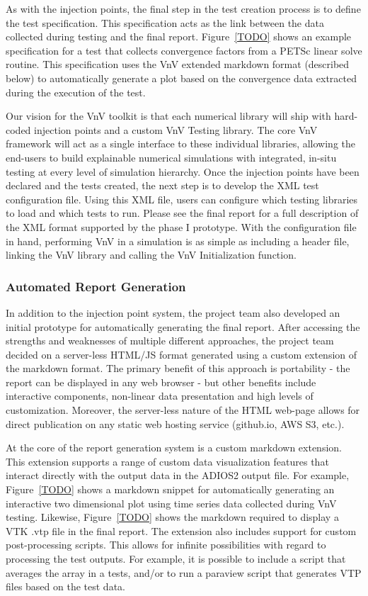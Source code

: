 As with the injection points, the final step in the test creation process is to define the test specification. This specification acts as the link between the data collected during testing and the final report. Figure~\ref{TODO} shows an example specification 
for a test that collects convergence factors from a PETSc linear solve routine. This specification uses the VnV extended markdown format (described below) to automatically generate a plot based on the convergence data extracted during the execution of the test.

Our vision for the VnV toolkit is that each numerical library will ship with hard-coded injection points and a custom VnV Testing library. The core VnV framework will act as a single interface to these individual libraries, allowing the end-users to build explainable numerical simulations with integrated, in-situ testing at every level of simulation hierarchy. Once the injection points have been declared and the tests created, the next step is to develop the XML test configuration file. Using this XML file, users can configure which testing libraries to load and which tests to run. Please see the final report for a full description of the XML format supported by the phase I prototype. With the configuration file in hand, performing VnV in a simulation is as simple as including a header file, linking the VnV library and calling the VnV Initialization function. 

\subsubsection{Automated Report Generation}

In addition to the injection point system, the project team also developed an initial prototype for automatically generating
the final report. After accessing the strengths and weaknesses of multiple different approaches, the project team
decided on a server-less HTML/JS format generated using a custom extension of the markdown format. The primary benefit of this approach is portability - the report can be displayed in any web browser - but other benefits include interactive components, non-linear data presentation and high levels of customization. Moreover, the server-less nature of the HTML web-page allows for direct publication on any static web hosting service (github.io, AWS S3, etc.). 

At the core of the report generation system is a custom markdown extension. This extension supports a range of custom data visualization features that interact directly with the output data in the ADIOS2 output file. For example, Figure~\ref{TODO} shows a markdown snippet for automatically generating an interactive two dimensional plot using time series data collected during VnV testing. Likewise, Figure~\ref{TODO} shows the markdown required to display a VTK .vtp file in the final report. The extension also includes support for custom post-processing scripts. This allows for infinite possibilities with regard to processing the test outputs. For example, it is possible to include a script that averages the array in a tests, and/or to run a paraview script that generates VTP files based on the test data. 

